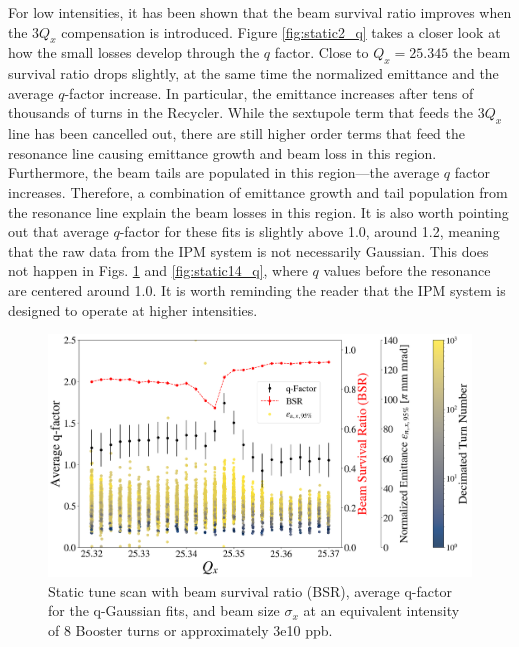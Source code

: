 For low intensities, it has been shown that the beam survival ratio improves when the $3Q_x$ compensation is introduced. Figure \ref{fig:static2_q} takes a closer look at how the small losses develop through the $q$ factor. Close to $Q_x=25.345$ the beam survival ratio drops slightly, at the same time the normalized emittance and the average $q$-factor increase. In particular, the emittance increases after tens of thousands of turns in the Recycler. While the sextupole term that feeds the $3Q_x$ line has been cancelled out, there are still higher order terms that feed the resonance line causing emittance growth and beam loss in this region. Furthermore, the beam tails are populated in this region---the average $q$ factor increases. Therefore, a combination of emittance growth and tail population from the resonance line explain the beam losses in this region. It is also worth pointing out that average $q$-factor for these fits is slightly above 1.0, around 1.2, meaning that the raw data from the IPM system is not necessarily Gaussian. This does not happen in Figs. \ref{fig:static8_q} and \ref{fig:static14_q}, where $q$ values before the resonance are centered around 1.0. It is worth reminding the reader that the IPM system is designed to operate at higher intensities. 

\begin{figure}[H]
    \centering
    \includegraphics[width=\columnwidth]{chapter6/static8turns_emittance_dampersOFF.png}
    \caption{Static tune scan with beam survival ratio (BSR), average q-factor for the q-Gaussian fits, and beam size $\sigma_x$ at an equivalent intensity of 8 Booster turns or approximately 3e10 ppb.}
    \label{fig:static8_q}
\end{figure}

